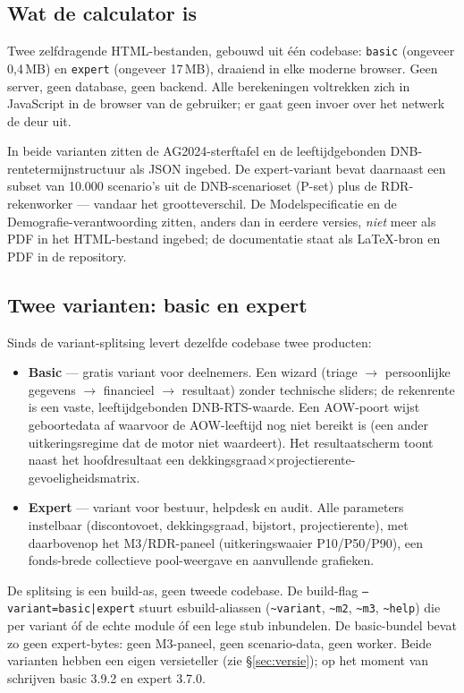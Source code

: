 \documentclass[11pt,a4paper]{article}
\newcommand{\code}[1]{\texttt{#1}}
\begin{document}
\subsection{Wat de calculator is}

Twee zelfdragende HTML-bestanden, gebouwd uit één codebase: \code{basic} (ongeveer 0,4\,MB) en \code{expert} (ongeveer 17\,MB), draaiend in elke moderne browser. Geen server, geen database, geen backend. Alle berekeningen voltrekken zich in JavaScript in de browser van de gebruiker; er gaat geen invoer over het netwerk de deur uit.

In beide varianten zitten de AG2024-sterftafel en de leeftijdgebonden DNB-rentetermijnstructuur als JSON ingebed. De expert-variant bevat daarnaast een subset van 10.000 scenario's uit de DNB-scenarioset (P-set) plus de RDR-rekenworker --- vandaar het grootteverschil. De Modelspecificatie en de Demografie-verantwoording zitten, anders dan in eerdere versies, \emph{niet} meer als PDF in het HTML-bestand ingebed; de documentatie staat als LaTeX-bron en PDF in de repository.

\subsection{Twee varianten: basic en expert}
\label{sec:varianten}

Sinds de variant-splitsing levert dezelfde codebase twee producten:

\begin{itemize}
\item \textbf{Basic} --- gratis variant voor deelnemers. Een wizard (triage $\rightarrow$ persoonlijke gegevens $\rightarrow$ financieel $\rightarrow$ resultaat) zonder technische sliders; de rekenrente is een vaste, leeftijdgebonden DNB-RTS-waarde. Een AOW-poort wijst geboortedata af waarvoor de AOW-leeftijd nog niet bereikt is (een ander uitkeringsregime dat de motor niet waardeert). Het resultaatscherm toont naast het hoofdresultaat een dekkingsgraad$\times$projectierente-gevoeligheidsmatrix.
\item \textbf{Expert} --- variant voor bestuur, helpdesk en audit. Alle parameters instelbaar (discontovoet, dekkingsgraad, bijstort, projectierente), met daarbovenop het M3/RDR-paneel (uitkeringswaaier P10/P50/P90), een fonds-brede collectieve pool-weergave en aanvullende grafieken.
\end{itemize}

De splitsing is een build-as, geen tweede codebase. De build-flag \code{--variant=basic|expert} stuurt esbuild-aliassen (\code{\textasciitilde variant}, \code{\textasciitilde m2}, \code{\textasciitilde m3}, \code{\textasciitilde help}) die per variant óf de echte module óf een lege stub inbundelen. De basic-bundel bevat zo geen expert-bytes: geen M3-paneel, geen scenario-data, geen worker. Beide varianten hebben een eigen versieteller (zie \S\ref{sec:versie}); op het moment van schrijven basic 3.9.2 en expert 3.7.0.
\end{document}
